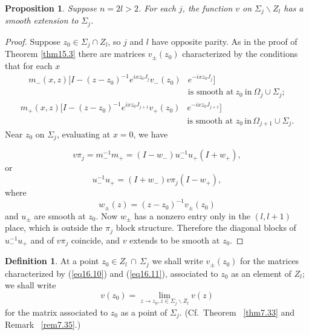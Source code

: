 \documentclass{surv-l}
\theoremstyle{plain}
\newtheorem{prop}[theorem]{Proposition}
\theoremstyle{definition}
\newtheorem{definition}[theorem]{Definition}
\numberwithin{equation}{chapter}
\begin{document}
\begin{prop}\label{prop16.9}
Suppose $n=2l>2$.  For each $j$,  the function $v$  on $\Sigma_{j}\backslash Z_{l}$ has a smooth extension to $\Sigma_{j}$.
\end{prop}

\begin{proof}

Suppose $z_{0}\in\Sigma_{j}\cap Z_{l}$, so $j$ and $l$ have opposite parity. As in the proof of Theorem \ref{thm15.3} there are matrices $v_{\pm}(z_{0})$ characterized by the conditions that for each $x$
\setcounter{equation}{9}
\begin{align}\label{eq16.10}
m_{-}(x, z)[I-(z-z_{0})^{-1}e^{ixz_{0}J_{j}}v_{-}(z_{0})&e^{-ixz_{0}J_{j}}]\\
&\text{is smooth  at}\ z_{0} \ \mathrm{in}\ \Omega_{j}  \cup\Sigma_{j}; \nonumber
\end{align}
\begin{align}\label{eq16.11}
m_+(x, z)[I-(z -z_{0})^{-1}e^{ixz_{0}J_{j+1}}v_{+}(z_{0})&e^{-ixz_{0}J_{j+1}}]\\
&\text{is smooth at } z_{0}\, \mathrm{in}\, \Omega_{j+1} \cup\Sigma_{j}. \nonumber
\end{align}
Near $z_{0}$ on $\Sigma_{j}$, evaluating at $x=0$, we have

\begin{equation*}
v\pi_{j}=m_{-}^{-1}m_{+}=(I-w_{-})u_{-}^{-1}u_{+}(I+w_{+}),
\end{equation*}
or
\begin{equation*}
u_{-}^{-1}u_{+}=(I+w_{-})v\pi_{j}(I-w_{+}),
\end{equation*}
where
\begin{equation*}
w_{\pm}(z)=(z-z_{0})^{-1}v_{\pm}(z_{0})
\end{equation*}
and $ u_{\pm}$ are smooth at $z_{0}$. Now $w_{\pm}$ has a nonzero entry only in the $(l, l+1)$ place, which is outside the $\pi_{j}$ block structure. Therefore the diagonal blocks of $u_{-}^{-1}u_{+}$ and of $v\pi_{j}$ coincide, and $v$ extends to be smooth at $z_{0}$.
\end{proof}
\setcounter{theorem}{11}
\begin{definition}\label{def16.12}
At a point $z_{0}\in Z_{l}\,\cap\,\Sigma_{j}$ we shall write $v_{\pm}(z_{0})$ for the matrices characterized by (\ref{eq16.10}) and (\ref{eq16.11}), associated to $z_{0}$ as an element of $Z_{l}$; we shall write
\begin{equation*}
v(z_{0})=\lim_{z\rightarrow z_{0},z\in\Sigma_{j}\backslash Z_{l}}v(z)
\end{equation*}
for the matrix associated to $z_{0}$ as a point of $\Sigma_{j}$. (Cf.~Theorem ~\ref{thm7.33} and Remark ~\ref{rem7.35}.)
\end{definition}
\end{document}
